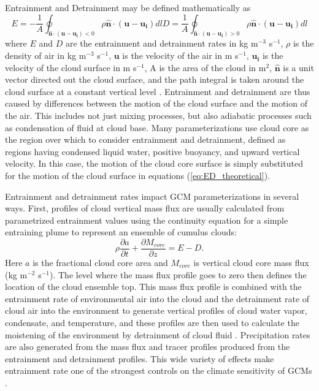 \documentclass[12pt]{article}
\begin{document}
Entrainment and Detrainment may be defined mathematically as
\begin{subequations}
 \label{eq:ED_theoretical}
\begin{equation}
E = -\frac{1}{A}\oint_{\mathbf{\hat{n}}\cdot(\mathbf{u} - \mathbf{u_i}) < 0}
\rho\mathbf{\hat{n}}\cdot(\mathbf{u}-\mathbf{u_i})dl
\end{equation}
\begin{equation}
D = \frac{1}{A}\oint_{\mathbf{\hat{n}}\cdot(\mathbf{u} - \mathbf{u_i}) > 0}
\rho\mathbf{\hat{n}}\cdot(\mathbf{u}-\mathbf{u_i})dl
\end{equation}
\end{subequations}
where $E$ and $D$ are the entrainment and detrainment rates in kg m$^{-3}$ 
s$^{-1}$, $\rho$ is the density of air in kg m$^{-3}$ s$^{-1}$, $\mathbf{u}$ is 
the velocity of the air in m s$^{-1}$, $\mathbf{u_i}$ is the velocity of the 
cloud surface in m s$^{-1}$, A is the area of the cloud in m$^2$, 
$\mathbf{\hat{n}}$ is a unit vector directed out the cloud surface, and the 
path integral is taken around the cloud surface at a constant vertical level 
\citep{Siebesma1998}.  Entrainment and detrainment are thus caused by 
differences between the motion of the cloud surface and the motion of the air.  
This includes not just mixing processes, but also adiabatic processes such as 
condensation of fluid at cloud base.  Many parameterizations use cloud core as 
the region over which to consider entrainment and detrainment, defined as
regions having condensed liquid water, positive buoyancy, and upward vertical
velocity.  In this case, the motion of the cloud core surface is simply 
substituted for the motion of the cloud surface in equations 
(\ref{eq:ED_theoretical}).

Entrainment and detrainment rates impact GCM parameterizations in several ways.
First, profiles of cloud vertical mass flux are usually calculated from 
parametrized entrainment values using the continuity equation for a 
simple entraining plume to represent an ensemble of cumulus clouds:
\begin{equation}
   \label{eq:continuity}
   \rho \frac{\partial a}{\partial t} 
   + \frac{\partial M_{core}}{\partial z} = E - D.
\end{equation}
Here $a$ is the fractional cloud core area  and $M_{core}$ is vertical cloud 
core mass flux (kg m$^{-2}$ s$^{-1}$). The level where the mass flux profile 
goes to zero then defines the location of the cloud ensemble top.  This mass 
flux profile is combined with the entrainment rate of environmental air into 
the cloud and the detrainment rate of cloud air into the environment to 
generate vertical profiles of cloud water vapor, condensate, and 
temperature, and these profiles are then used to calculate the moistening 
of the environment by detrainment of cloud fluid 
\citep{Tiedtke1989, Kain1990}.  Precipitation rates are also generated from the
mass flux and tracer profiles produced from the entrainment and detrainment
profiles.  This wide variety of effects make entrainment rate one of the 
strongest controls on the climate sensitivity of GCMs 
\citep{Stainforth2005, Rougier2009}.
\end{document}
